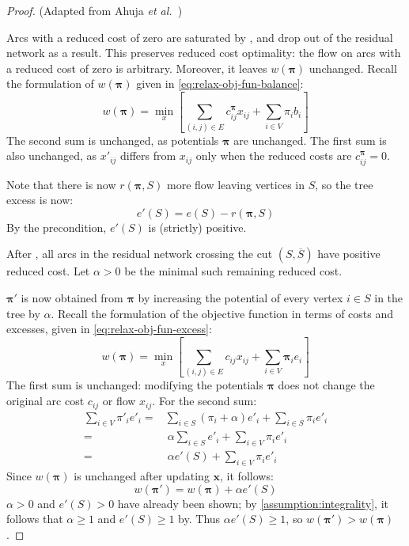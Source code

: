 \begin{proof} (Adapted from Ahuja \textit{et al.}~\cite[p.~334]{Ahuja:1993})
    
    Arcs with a reduced cost of zero are saturated by , and drop out of the residual network as a result. This preserves reduced cost optimality: the flow on arcs with a reduced cost of zero is arbitrary. Moreover, it leaves $w(\boldsymbol{\pi})$ unchanged. Recall the formulation of $w(\boldsymbol{\pi})$ given in \cref{eq:relax-obj-fun-balance}:
    \[w(\boldsymbol{\pi})=\min_{x}\left[\sum_{\left(i,j\right)\in E}c_{ij}^{\boldsymbol{\pi}}x_{ij}+\sum_{i\in V}\pi_{i}b_{i}\right]\]
    The second sum is unchanged, as potentials $\boldsymbol{\pi}$ are unchanged. The first sum is also unchanged, as $x'_{ij}$ differs from $x_{ij}$ only when the reduced costs are $c_{ij}^{\boldsymbol{\pi}}=0$.
    
    Note that there is now $r(\boldsymbol{\pi},S)$ more flow leaving vertices in $S$, so the tree excess is now:
    \[e'(S) = e(S) - r(\boldsymbol{\pi},S)\]
    By the precondition, $e'(S)$ is (strictly) positive.
    
    After , all arcs in the residual network crossing the cut $\left(S,\overline{S}\right)$ have positive reduced cost\footnotemark. Let $\alpha > 0$ be the minimal such remaining reduced cost.
    
    $\boldsymbol{\pi}'$ is now obtained from $\boldsymbol{\pi}$ by increasing the potential of every vertex $i \in S$ in the tree by $\alpha$. Recall the formulation of the objective function in terms of costs and excesses, given in \cref{eq:relax-obj-fun-excess}:
    \[w\left(\boldsymbol{\pi}\right)=\min_{x}\left[\sum_{\left(i,j\right)\in E}c_{ij}x_{ij}+\sum_{i\in V}\boldsymbol{\pi}_{i}e_{i}\right]\]
    The first sum is unchanged: modifying the potentials $\boldsymbol{\pi}$ does not change the original arc cost $c_{ij}$ or flow $x_{ij}$. For the second sum:
    \begin{align*}
    \sum_{i\in V}\pi'_{i}e'_{i}= & \sum_{i\in S}\left(\pi_{i}+\alpha\right)e'_{i}+\sum_{i\in\overline{S}}\pi_{i}e'_{i}\\
    = &\:\alpha\sum_{i\in S}e'_{i}+\sum_{i\in V}\pi_{i}e'_{i}\\
    = &\:\alpha e'(S)+\sum_{i\in V}\pi_{i}e'_{i}
    \end{align*}
    Since $w\left(\boldsymbol{\pi}\right)$ is unchanged after updating $\mathbf{x}$, it follows:
    \[w\left(\boldsymbol{\pi}'\right)=w(\boldsymbol{\pi})+\alpha e'(S)\]
    $\alpha > 0$ and $e'(S) > 0$ have already been shown; by \cref{assumption:integrality}, it follows that $\alpha \geq 1 $ and $e'(S) \geq 1$ by. Thus $\alpha e'(S) \geq 1$, so $w\left(\boldsymbol{\pi}'\right) > w\left(\boldsymbol{\pi}\right)$.
    

\end{proof}
